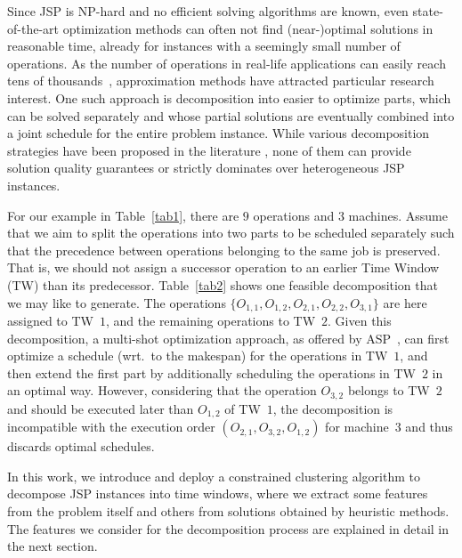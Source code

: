\documentclass[runningheads]{llncs}
\begin{document}
Since JSP is NP-hard \cite{garey1976complexity,SOTSKOV1995237}
and
no efficient solving algorithms are known, 
even state-of-the-art optimization methods can often not find (near-)optimal solutions in reasonable time, already for instances with a seemingly small number of operations.
As the number of operations in real-life applications
can easily reach tens of thousands~\cite{zhang2010hybrid},
approximation methods have attracted particular research interest.
One such approach is decomposition into easier to optimize parts,
which can be solved separately and whose partial solutions are
eventually combined into a joint schedule for the entire problem instance.
While various decomposition strategies have been proposed in the literature \cite{zhai2014decomposition,singer2001decomposition,ovacik2012decomposition,uzsoy2000performance},
none of them can provide solution quality guarantees
or strictly dominates over heterogeneous JSP instances. 

For our example in Table~\ref{tab1}, there are $9$ operations and $3$ machines.
Assume that we aim to split the operations into two parts to be scheduled separately such that the precedence between operations belonging to the same job is preserved.
That is, we should not assign a successor operation to an earlier Time Window (TW)
than its predecessor. %
Table~\ref{tab2} shows one feasible decomposition that we may like to generate.
The operations $\{ O_{1,1}, O_{1,2}, O_{2,1}, O_{2,2}, O_{3,1} \}$ are here assigned to TW~$1$, and the remaining operations to TW~$2$.
Given this decomposition, a multi-shot optimization approach,
as offered by ASP~\cite{gekakasc17a},
can first optimize a schedule (wrt.\ to the makespan)
for the operations in TW~$1$, and then extend the first part by
additionally scheduling the operations in TW~$2$ in an optimal way.
However, considering that the operation $O_{3,2}$ belongs to TW~$2$
and should be executed later than $O_{1,2}$ of TW~$1$,
the decomposition is incompatible with the execution order
$(O_{2,1}, O_{3,2}, O_{1,2})$ for machine~$3$ and thus discards optimal schedules.

In this work, we introduce and deploy a constrained clustering algorithm to decompose  JSP instances into time windows, where we extract some features from the problem itself and others from solutions obtained by heuristic methods. The features we consider for the decomposition process are explained in detail in the next section.
\end{document}
